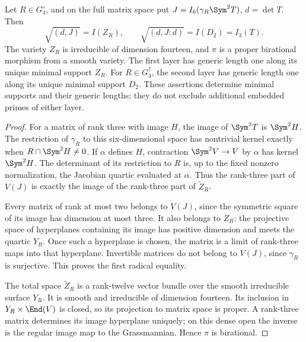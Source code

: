 \begin{theorem}
\label{thm:global-minimal-supports}
Let \(R\in G_4^\circ\), and on the full matrix space put
\(J=I_6(\gamma_R\Sym^2T)\), \(d=\det T\).  Then
\[
 \sqrt{(d,J)}=I(Z_R),
 \qquad
 \sqrt{(d,J:d)}=I(D_2)=I_3(T).
\]
The variety \(Z_R\) is irreducible of dimension fourteen, and
\(\pi\) is a proper birational morphism from a smooth variety.
The first layer has generic length one along its unique minimal
support \(Z_R\).  For \(R\in G_4^\dagger\), the second layer has
generic length one along its unique minimal support \(D_2\).
These assertions determine minimal supports and their generic lengths;
they do not exclude additional embedded primes of either layer.
\end{theorem}
\begin{proof}
For a matrix of rank three with image \(H\), the image of
\(\Sym^2T\) is \(\Sym^2H\).  The restriction of \(\gamma_R\)
to this six-dimensional space has nontrivial kernel exactly when
\(R\cap\Sym^2H\ne0\).  If \(\alpha\) defines \(H\), contraction
\(\Sym^2V\to V\) by \(\alpha\) has kernel \(\Sym^2H\).
The determinant of its restriction to \(R\) is, up to the fixed
nonzero normalization, the Jacobian quartic evaluated at \(\alpha\).
Thus the rank-three part of \(V(J)\) is exactly the image of the
rank-three part of \(\widetilde Z_R\).

Every matrix of rank at most two belongs to \(V(J)\), since the
symmetric square of its image has dimension at most three.  It also
belongs to \(Z_R\): the projective space of hyperplanes containing
its image has positive dimension and meets the quartic \(Y_R\).
Once such a hyperplane is chosen, the matrix is a limit of rank-three
maps into that hyperplane.  Invertible matrices do not belong to
\(V(J)\), since \(\gamma_R\) is surjective.  This proves the first
radical equality.

The total space \(\widetilde Z_R\) is a rank-twelve vector bundle
over the smooth irreducible surface \(Y_R\).  It is smooth and
irreducible of dimension fourteen.  Its inclusion in
\(Y_R\times\End(V)\) is closed, so its projection to matrix space
is proper.  A rank-three matrix determines its image hyperplane
uniquely; on this dense open the inverse is the regular image map to
the Grassmannian.  Hence \(\pi\) is birational.


\end{proof}

